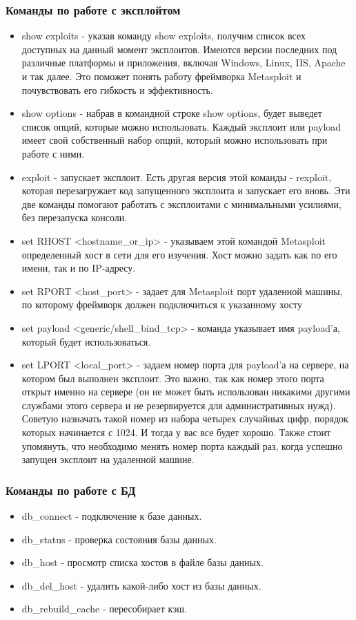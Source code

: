 \documentclass[a4paper, 14pt]{article}				%
\begin{document}
\subsubsection{Команды по работе с эксплойтом}
\begin{itemize}
\item show exploits - указав команду show exploits, получим список всех доступных на данный момент эксплоитов. Имеются версии последних под различные платформы и приложения, включая Windows, Linux, IIS, Apache и так далее. Это поможет понять работу фреймворка Metasploit и почувствовать его гибкость и эффективность.
\item show options - набрав в командной строке show options, будет выведет список опций, которые можно использовать. Каждый эксплоит или payload имеет свой собственный набор опций, который можно использовать при работе с ними.
\item exploit - запускает эксплоит. Есть другая версия этой команды - rexploit, которая перезагружает код запущенного эксплоита и запускает его вновь. Эти две команды помогают работать с эксплоитами с минимальными усилиями, без перезапуска консоли.
\item set RHOST <hostname\_or\_ip> - указываем этой командой Metasploit определенный хост в сети для его изучения. Хост можно задать как по его имени, так и по IP-адресу.
\item set RPORT <host\_port> - задает для Metasploit порт удаленной машины, по которому фреймворк должен подключиться к указанному хосту
\item set payload <generic/shell\_bind\_tcp> - команда указывает имя payload’а, который будет использоваться.
\item  set LPORT <local\_port> - задаем номер порта для payload’а на сервере, на котором был выполнен эксплоит. Это важно, так как номер этого порта открыт именно на сервере (он не может быть использован никакими другими службами этого сервера и не резервируется для административных нужд). Советую назначать такой номер из набора четырех случайных цифр, порядок которых начинается с 1024. И тогда у вас все будет хорошо. Также стоит упомянуть, что необходимо менять номер порта каждый раз, когда успешно запущен эксплоит на удаленной машине.
\end{itemize}

\subsubsection{Команды по работе с БД}
\begin{itemize}
\item db\_connect - подключение к базе данных.
\item db\_status - проверка состояния базы данных.
\item db\_host - просмотр списка хостов в файле базы данных.
\item db\_del\_host - удалить какой-либо хост из базы данных.
\item db\_rebuild\_cache - пересобирает кэш.
\end{itemize}
\end{document}
